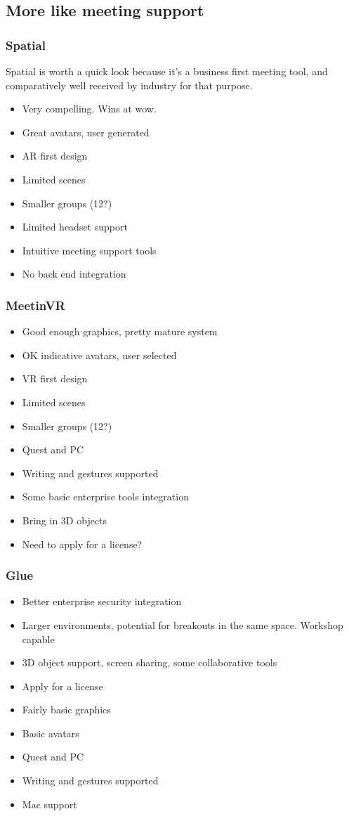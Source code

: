 \subsection{More like meeting support}
\subsubsection{Spatial}
Spatial is worth a quick look because it's a business first meeting tool, and comparatively well received by industry for that purpose.
\begin{itemize}
\item Very compelling. Wins at wow.
\item Great avatars, user generated
\item AR first design
\item Limited scenes
\item Smaller groups (12?)
\item Limited headset support
\item Intuitive meeting support tools
\item No back end integration
\end{itemize}
\subsubsection{MeetinVR}
\begin{itemize}
\item Good enough graphics, pretty mature system
\item OK indicative avatars, user selected
\item VR first design
\item Limited scenes
\item Smaller groups (12?)
\item Quest and PC
\item Writing and gestures supported
\item Some basic enterprise tools integration
\item Bring in 3D objects
\item Need to apply for a license?
\end{itemize}
\subsubsection{Glue}
\begin{itemize}
\item Better enterprise security integration
\item Larger environments, potential for breakouts in the same space. Workshop capable
\item 3D object support, screen sharing, some collaborative tools
\item Apply for a license
\item Fairly basic graphics
\item Basic avatars
\item Quest and PC
\item Writing and gestures supported
\item Mac support
\end{itemize}
